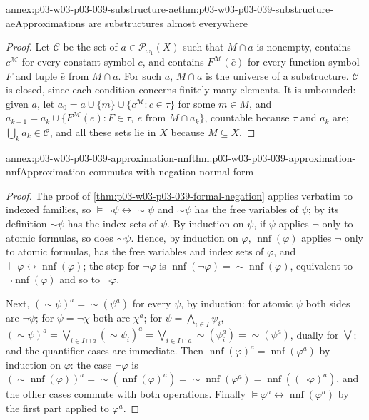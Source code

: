 \begin{annexitem}{annex:p03-w03-p03-039-substructure-ae}{thm:p03-w03-p03-039-substructure-ae}{Approximations are substructures almost everywhere}
\begin{proof}
Let \(\mathcal C\) be the set of \(a\in\mathcal P_{\omega_1}(X)\) such that
\(M\cap a\) is nonempty, contains \(c^{\mathcal M}\) for every constant
symbol \(c\), and contains \(F^{\mathcal M}(\bar e)\) for every function
symbol \(F\) and tuple \(\bar e\) from \(M\cap a\). For such \(a\),
\(M\cap a\) is the universe of a substructure. \(\mathcal C\) is closed,
since each condition concerns finitely many elements. It is unbounded:
given \(a\), let \(a_0=a\cup\{m\}\cup\{c^{\mathcal M}:c\in\tau\}\) for some
\(m\in M\), and \(a_{k+1}=a_k\cup\{F^{\mathcal M}(\bar e):F\in\tau,\ \bar e\text{ from }M\cap a_k\}\),
countable because \(\tau\) and \(a_k\) are; \(\bigcup_ka_k\in\mathcal C\),
and all these sets lie in \(X\) because \(M\subseteq X\).
\end{proof}
\end{annexitem}

\begin{annexitem}{annex:p03-w03-p03-039-approximation-nnf}{thm:p03-w03-p03-039-approximation-nnf}{Approximation commutes with negation normal form}
\begin{proof}
The proof of \cref{thm:p03-w03-p03-039-formal-negation} applies verbatim to
indexed families, so \(\models\neg\psi\leftrightarrow{\sim}\psi\) and
\({\sim}\psi\) has the free variables of \(\psi\); by its definition
\({\sim}\psi\) has the index sets of \(\psi\). By induction on \(\psi\), if
\(\psi\) applies \(\neg\) only to atomic formulas, so does \({\sim}\psi\).
Hence, by induction on \(\varphi\), \(\operatorname{nnf}(\varphi)\) applies
\(\neg\) only to atomic formulas, has the free variables and index sets of
\(\varphi\), and \(\models\varphi\leftrightarrow\operatorname{nnf}(\varphi)\);
the step for \(\neg\varphi\) is
\(\operatorname{nnf}(\neg\varphi)={\sim}\operatorname{nnf}(\varphi)\), equivalent
to \(\neg\operatorname{nnf}(\varphi)\) and so to \(\neg\varphi\).

Next, \(({\sim}\psi)^a={\sim}(\psi^a)\) for every \(\psi\), by induction: for
atomic \(\psi\) both sides are \(\neg\psi\); for \(\psi=\neg\chi\) both are
\(\chi^a\); for \(\psi=\bigwedge_{i\in I}\psi_i\),
\(({\sim}\psi)^a=\bigvee_{i\in I\cap a}({\sim}\psi_i)^a=\bigvee_{i\in I\cap a}{\sim}(\psi_i^a)={\sim}(\psi^a)\),
dually for \(\bigvee\); and the quantifier cases are immediate. Then
\(\operatorname{nnf}(\varphi)^a=\operatorname{nnf}(\varphi^a)\) by induction
on \(\varphi\): the case \(\neg\varphi\) is
\(({\sim}\operatorname{nnf}(\varphi))^a={\sim}(\operatorname{nnf}(\varphi)^a)={\sim}\operatorname{nnf}(\varphi^a)=\operatorname{nnf}((\neg\varphi)^a)\),
and the other cases commute with both operations. Finally
\(\models\varphi^a\leftrightarrow\operatorname{nnf}(\varphi^a)\) by the first
part applied to \(\varphi^a\).
\end{proof}
\end{annexitem}

